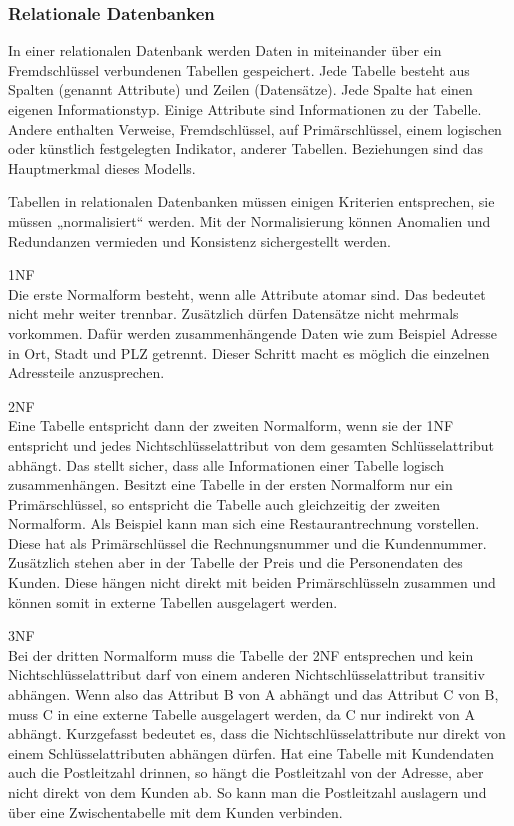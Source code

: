 \subsubsection{Relationale Datenbanken}
In einer relationalen Datenbank werden Daten in miteinander über ein Fremdschlüssel verbundenen Tabellen gespeichert. Jede Tabelle besteht aus Spalten (genannt Attribute) und Zeilen (Datensätze). Jede Spalte hat einen eigenen Informationstyp.  Einige Attribute sind Informationen zu der Tabelle. Andere enthalten Verweise, Fremdschlüssel, auf Primärschlüssel, einem logischen oder künstlich festgelegten Indikator, anderer Tabellen. Beziehungen sind das Hauptmerkmal dieses Modells. 

Tabellen in relationalen Datenbanken müssen einigen Kriterien entsprechen, sie müssen „normalisiert“ werden. Mit der Normalisierung können Anomalien und Redundanzen vermieden und Konsistenz sichergestellt werden.

\begin{description}
\item 1NF \\
Die erste Normalform besteht, wenn alle Attribute atomar sind. Das bedeutet nicht mehr weiter trennbar. Zusätzlich dürfen Datensätze nicht mehrmals vorkommen. Dafür werden zusammenhängende Daten wie zum Beispiel Adresse in Ort, Stadt und PLZ getrennt. Dieser Schritt macht es möglich die einzelnen Adressteile anzusprechen.
\item 2NF \\
Eine Tabelle entspricht dann der zweiten Normalform, wenn sie der 1NF entspricht und jedes Nichtschlüsselattribut von dem gesamten Schlüsselattribut abhängt. Das stellt sicher, dass alle Informationen einer Tabelle logisch zusammenhängen. Besitzt eine Tabelle in der ersten Normalform nur ein Primärschlüssel, so entspricht die Tabelle auch gleichzeitig der zweiten Normalform. \linebreak  Als Beispiel kann man sich eine Restaurantrechnung vorstellen. Diese hat als Primärschlüssel die Rechnungsnummer und die Kundennummer. Zusätzlich stehen aber in der Tabelle der Preis und die Personendaten des Kunden. Diese hängen nicht direkt mit beiden Primärschlüsseln zusammen und können somit in externe Tabellen ausgelagert werden.
\item 3NF \\
Bei der dritten Normalform muss die Tabelle der 2NF entsprechen und kein Nichtschlüsselattribut darf von einem anderen Nichtschlüsselattribut transitiv abhängen. Wenn also das Attribut B von A abhängt und das Attribut C von B, muss C in eine externe Tabelle ausgelagert werden, da C nur indirekt von A abhängt. Kurzgefasst bedeutet es, dass die Nichtschlüsselattribute nur direkt von einem Schlüsselattributen abhängen dürfen. Hat eine Tabelle mit Kundendaten auch die Postleitzahl drinnen, so hängt die Postleitzahl von der Adresse, aber nicht direkt von dem Kunden ab. So kann man die Postleitzahl auslagern und über eine Zwischentabelle mit dem Kunden verbinden.
\end{description}

